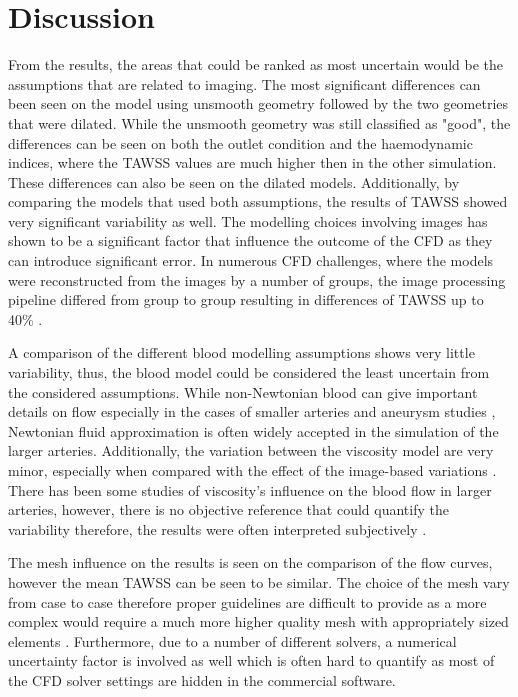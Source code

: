 \chapter{Discussion}
\label{chapterlabel7}


From the results, the areas that could be ranked as most uncertain would be the assumptions that are related to imaging. The most significant differences can been seen on the model using unsmooth geometry followed by the two geometries that were dilated. While the unsmooth geometry was still classified as "good", the differences can be seen on both the outlet condition and the haemodynamic indices, where the TAWSS values are much higher then in the other simulation. These differences can also be seen on the dilated models. Additionally, by comparing the models that used both assumptions, the results of TAWSS showed very significant variability as well. The modelling choices involving images has shown to be a significant factor that influence the outcome of the CFD as they can introduce significant error. In numerous CFD challenges, where the models were reconstructed from the images by a number of groups, the image processing pipeline differed from group to group resulting in differences of TAWSS up to 40\% \cite{Steinman2018Editorial:Utility, Huberts2018WhatPaper}.\par

A comparison of the different blood modelling assumptions shows very little variability, thus, the blood model could be considered the least uncertain from the considered assumptions. While non-Newtonian blood can give important details on flow especially in the cases of smaller arteries and aneurysm studies \cite{Johnston2006Non-NewtonianSimulations, Steinman2012AssumptionsHemodynamics}, Newtonian fluid approximation is often widely accepted in the simulation of the larger arteries. Additionally, the variation between the viscosity model are very minor, especially when compared with the effect of the image-based variations \cite{Steinman2019HowVariability, Lee2007OnBifurcation}. There has been some studies of viscosity's influence on the blood flow in larger arteries, however, there is no objective reference that could quantify the variability therefore, the results were often interpreted subjectively \cite{Steinman2019HowVariability}.\par

The mesh influence on the results is seen on the comparison of the flow curves, however the mean TAWSS can be seen to be similar. The choice of the mesh vary from case to case therefore proper guidelines are difficult to provide as a more complex would require a much more higher quality mesh with appropriately sized elements \cite{Hodis2012GridAneurysms}. Furthermore, due to a number of different solvers, a numerical uncertainty factor is involved as well which is often hard to quantify as most of the CFD solver settings are hidden in the commercial software. \par

